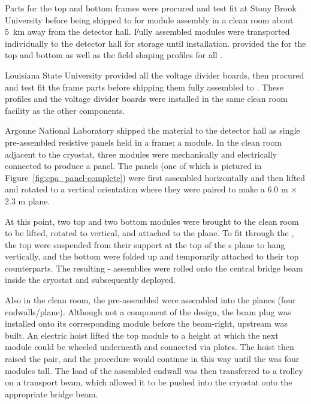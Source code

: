 Parts for the top and bottom  frames were procured and test fit at Stony Brook University before being shipped to  for module assembly in a clean room about \SI{5}{km} away from the detector hall.
Fully assembled modules were transported individually to the detector hall for storage until installation.  provided the  for the top and bottom  as well as the field shaping profiles for all .


Louisiana State University provided all the voltage divider boards, then procured and test fit the  frame parts before shipping them fully assembled to .
These profiles and the voltage divider boards were installed in the same  clean room facility as the other  components.

Argonne National Laboratory shipped the  material to the detector hall as single pre-assembled resistive panels held in a \frfour frame; a  module. 
In the clean room adjacent to the  cryostat, three  modules were mechanically and electrically connected to produce a  panel. %
The  panels (one of which is pictured in Figure~\ref{fig:cpa_panel-complete}) were first assembled horizontally and then lifted and rotated to a vertical orientation where they were paired to make a 6.0 m $\times$ 2.3 m  plane.

At this point, two top and two bottom  modules were brought to the clean room to be lifted, rotated to vertical, and attached to the  plane. 
To fit through the , the top  were suspended from their support at the top of the s plane to hang vertically, and the bottom  were folded up and temporarily attached to their top  counterparts.
The resulting - assemblies were rolled onto the central bridge beam inside the cryostat and subsequently deployed. 

Also in the  clean room, the pre-assembled  %
were assembled into the  planes (four endwalls/plane). %
Although not a component of the  design, 
the beam plug was installed onto its corresponding module %
before the beam-right, upstream  was built.
An electric hoist lifted the top %
module to a height at which the next %
module could be wheeled underneath and connected via  plates.
The hoist then raised the pair, and the procedure would continue in this way until the  was four %
modules tall.
The load of the assembled endwall was then transferred to a trolley on a transport beam, which allowed it to be pushed into the cryostat onto the appropriate bridge beam.

